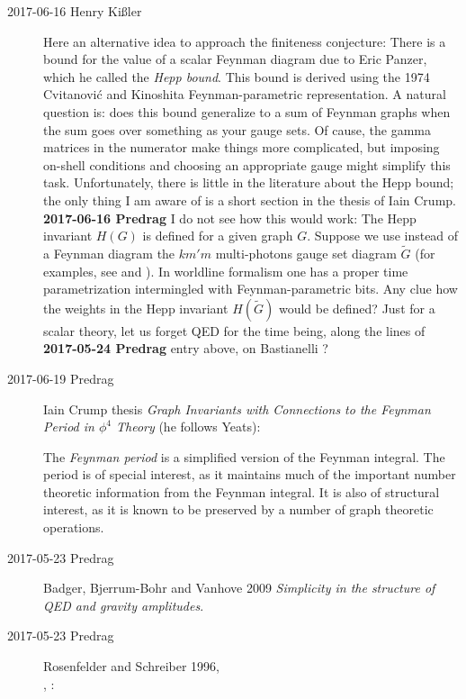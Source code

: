 \begin{description}
\item[2017-06-16 Henry Ki{\ss}ler]
 \label{sect:Hepp}
Here an alternative idea to approach the finiteness conjecture: There is
a bound for the value of a scalar Feynman diagram due to Eric Panzer,
which he called the \emph{Hepp bound}. This bound is derived using the 1974
Cvitanovi{\'c} and Kinoshita Feynman-parametric
representation. A natural question is: does this bound generalize to a
sum of Feynman graphs when the sum goes over something as your gauge
sets. Of cause, the gamma matrices in the numerator make things more
complicated, but imposing on-shell conditions and choosing an appropriate
gauge might simplify this task. Unfortunately, there is little in the
literature about the Hepp bound; the only thing I am aware
of is a short section in the
{thesis} of Iain Crump.
\\{\bf 2017-06-16 Predrag}
I do not see how this would work: The Hepp invariant $H(G)$ is defined
for a given graph $G$. Suppose we use instead of a Feynman diagram the
$km'm$ multi-photons gauge set diagram $\tilde{G}$ (for examples, see
 and ). In worldline formalism
one has a proper time parametrization intermingled with
Feynman-parametric bits. Any clue how the weights in the Hepp invariant
$H(\tilde{G})$ would be defined? Just for a scalar theory, let us forget QED
for the time being, along the lines of
{\bf 2017-05-24 Predrag} entry above, on Bastianelli \etal{}?

\item[2017-06-19 Predrag]
Iain Crump
{thesis} {\em Graph Invariants with Connections to the
Feynman Period in $\phi^4$ Theory} (he follows Yeats):

The \emph{Feynman period} is a simplified version of the Feynman integral. The
period is of special interest, as it maintains much of the important
number theoretic information from the Feynman integral. It is also of
structural interest, as it is known to be preserved by a number of graph
theoretic operations.


\item[2017-05-23 Predrag]
Badger, Bjerrum-Bohr and Vanhove 2009
{\em Simplicity in the structure of {QED} and gravity amplitudes}.

\item[2017-05-23 Predrag]
Rosenfelder and Schreiber 1996,
\\
, :


\end{description}
